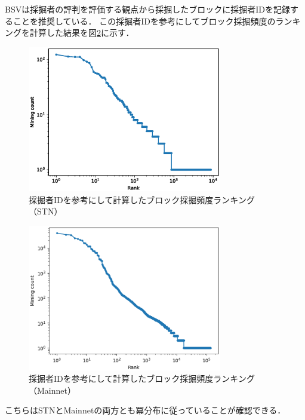 \documentclass[graybox]{svmult}
\begin{document}
BSVは採掘者の評判を評価する観点から採掘したブロックに採掘者IDを記録することを推奨している．
この採掘者IDを参考にしてブロック採掘頻度のランキングを計算した結果を図\ref{fig:minerrank}に示す．
%
\begin{figure}[t]
  \vspace{-45mm}
  \begin{center}
    \includegraphics[width=85mm]{bsv_stn-block_miners-ranking-loglog.eps}
  \end{center}
  \vspace{45mm}
  \caption{採掘者IDを参考にして計算したブロック採掘頻度ランキング（STN）}
  \label{fig:minerrank}
\end{figure}
%
%
\begin{figure}[t]
  \begin{center}
    \includegraphics[width=85mm]{bsv_mainnet-block_miners-ranking-loglog.eps}
  \end{center}
  \caption{採掘者IDを参考にして計算したブロック採掘頻度ランキング（Mainnet）}
  \label{fig:minerrank}
\end{figure}
%
こちらはSTNとMainnetの両方とも冪分布に従っていることが確認できる．
\end{document}
